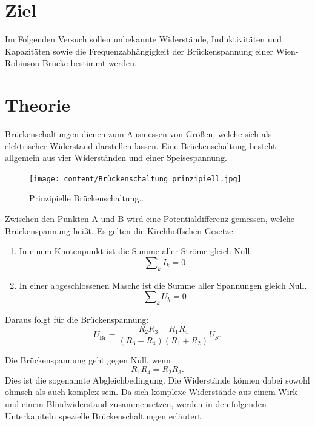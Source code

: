 \section{Ziel}
\label{sec:Ziel}
Im Folgenden Versuch sollen unbekannte Widerstände, Induktivitäten und Kapazitäten sowie die Frequenzabhängigkeit der Brückenspannung einer Wien-Robinson Brücke bestimmt werden.

\section{Theorie}
\label{sec:Theorie}
Brückenschaltungen dienen zum Ausmessen von Größen, welche sich als elektrischer Widerstand darstellen lassen. Eine Brückenschaltung besteht allgemein aus vier Widerständen und einer Speisespannung.

\begin{figure}
  \centering
  \texttt{[image: content/Brückenschaltung\_prinzipiell.jpg]}
  \caption{Prinzipielle Brückenschaltung.\cite{anleitung302}.}
  \label{fig:brückenschaltung}
\end{figure}

Zwischen den Punkten A und B wird eine Potentialdifferenz gemessen, welche Brückenspannung heißt.
Es gelten die Kirchhoffschen Gesetze.
\begin{enumerate}
  \item In einem Knotenpunkt ist die Summe aller Ströme gleich Null.
  \begin{equation}
    \mathrm\sum_{k} I_k = 0
  \end{equation}
  \item In einer abgeschlossenen Masche ist die Summe aller Spannungen gleich Null.
  \begin{equation}
    \mathrm\sum_{k} U_k = 0
  \end{equation}
\end{enumerate}

Daraus folgt für die Brückenspannung:
\begin{equation}
  U_{\mathrm{Br}} = \frac{R_{2}R_3 - R_{1}R_4}{(R_3 + R_4)(R_{1} + R_{2})} U_S .
\end{equation}

Die Brückenspannung geht gegen Null, wenn
\begin{equation}
  R_{1} R_4 = R_{2} R_3 .
\end{equation}
Dies ist die sogenannte Abgleichbedingung.
Die Widerstände können dabei sowohl ohmsch als auch komplex sein. Da sich komplexe Widerstände aus einem Wirk- und einem Blindwiderstand  zusammensetzen, werden in den folgenden Unterkapiteln spezielle Brückenschaltungen erläutert.

